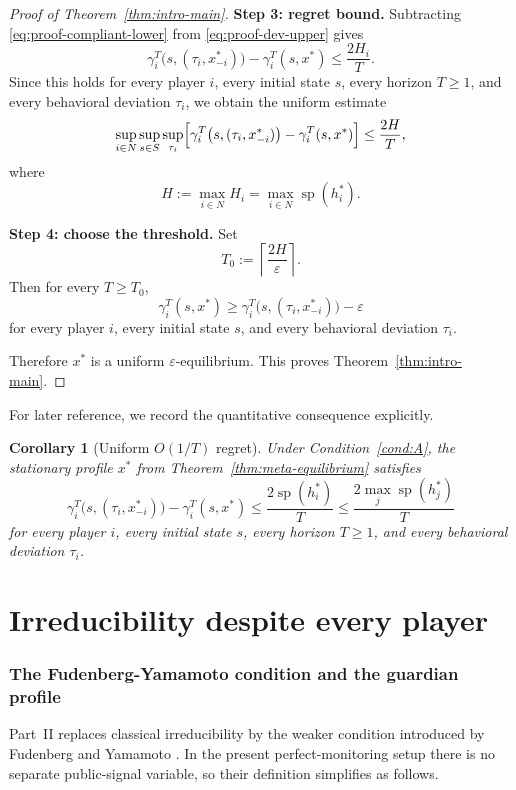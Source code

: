 \documentclass[11pt]{article}
\newtheorem{corollary}[theorem]{Corollary}
\theoremstyle{definition}
\newcommand{\1}{\mathbf{1}}
\DeclareMathOperator{\spn}{sp}
\begin{document}
\begin{proof}[Proof of Theorem~\ref{thm:intro-main}]
\smallskip
\noindent
\textbf{Step 3: regret bound.}
Subtracting \eqref{eq:proof-compliant-lower} from \eqref{eq:proof-dev-upper} gives
\[
\gamma_i^T\bigl(s,(\tau_i,x_{-i}^*)\bigr)-\gamma_i^T(s,x^*)\le \frac{2H_i}{T}.
\]
Since this holds for every player $i$, every initial state $s$, every horizon $T\ge1$, and every behavioral deviation $\tau_i$, we obtain the uniform estimate
\[
\sup_{i\in N}\sup_{s\in S}\sup_{\tau_i}\Bigl[\gamma_i^T\bigl(s,(\tau_i,x_{-i}^*)\bigr)-\gamma_i^T(s,x^*)\Bigr]
\le \frac{2H}{T},
\]
where
\[
H:=\max_{i\in N}H_i=\max_{i\in N}\spn(h_i^*).
\]

\smallskip
\noindent
\textbf{Step 4: choose the threshold.}
Set
\[
T_0:=\left\lceil \frac{2H}{\varepsilon}\right\rceil.
\]
Then for every $T\ge T_0$,
\[
\gamma_i^T(s,x^*)\ge \gamma_i^T\bigl(s,(\tau_i,x_{-i}^*)\bigr)-\varepsilon
\]
for every player $i$, every initial state $s$, and every behavioral deviation $\tau_i$.

Therefore $x^*$ is a uniform $\varepsilon$-equilibrium. This proves Theorem~\ref{thm:intro-main}.
\end{proof}

For later reference, we record the quantitative consequence explicitly.

\begin{corollary}[Uniform $O(1/T)$ regret]\label{cor:o1overT}
Under Condition~\ref{cond:A}, the stationary profile $x^*$ from Theorem~\ref{thm:meta-equilibrium} satisfies
\[
\gamma_i^T\bigl(s,(\tau_i,x_{-i}^*)\bigr)-\gamma_i^T(s,x^*)
\le \frac{2\spn(h_i^*)}{T}
\le \frac{2\max_j\spn(h_j^*)}{T}
\]
for every player $i$, every initial state $s$, every horizon $T\ge1$, and every behavioral deviation $\tau_i$.
\end{corollary}




\part{Irreducibility despite every player}

\section{The Fudenberg-Yamamoto condition and the guardian profile}\label{sec:FY}

Part~II replaces classical irreducibility by the weaker condition introduced by Fudenberg and Yamamoto \cite{FudenbergYamamoto2011}. In the present perfect-monitoring setup there is no separate public-signal variable, so their definition simplifies as follows.
\end{document}
